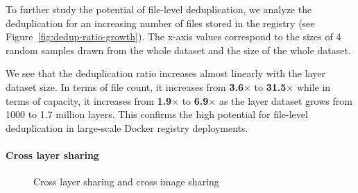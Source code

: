 
To further study the potential of file-level deduplication, we analyze the deduplication
for an increasing number of files stored in the registry (see Figure~\ref{fig:dedup-ratio-growth}).
%
%
The x-axis values correspond to the sizes of 4 random samples drawn from the whole dataset and the size of the
whole dataset.

We see that the deduplication ratio increases almost linearly with the layer dataset size.
%
In terms of file count, it increases from \textbf{3.6$\times$} to \textbf{31.5$\times$} while
in terms of capacity, it increases from \textbf{1.9$\times$} to
\textbf{6.9$\times$} as the layer dataset grows from 1000 to 1.7 million layers.
%
This confirms the high potential for file-level deduplication in large-scale
Docker registry deployments.
%

\paragraph{Cross layer sharing}

\begin{figure}
	\centering
	\caption{Cross layer sharing and cross image sharing}
	\label{fig:dedup-ratio}
\end{figure} 


